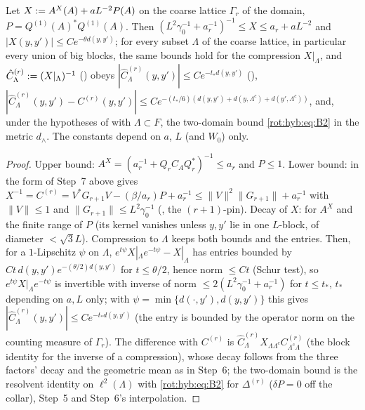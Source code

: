 \begin{proposition}\label{rot:hyb:prop:CLam}
Let $X:= A^X(A)+aL^{-2}P(A)$ on the coarse lattice $\Gamma_r$ of the domain, $P=Q^{(1)}(A)^*Q^{(1)}(A)$. Then $(L^2\gamma_0^{-1}+a_r^{-1})^{-1}\le X\le a_r+aL^{-2}$ and $|X(y,y')|\le Ce^{-\theta d(y,y')}$; for every subset $\Lambda$ of the coarse lattice, in particular every union of big blocks, the same bounds hold for the compression $X|_\Lambda$, and $\hat C^{(r)}_\Lambda:=(X|_\Lambda)^{-1}$ (\cite[(5.53)]{K2}) obeys $|\hat C^{(r)}_\Lambda(y,y')|\le Ce^{-t_*d(y,y')}$ (\cite[(5.54)]{K2}), $|\hat C^{(r)}_\Lambda(y,y')-C^{(r)}(y,y')|\le Ce^{-(t_*/6)(d(y,y')+d(y,\Lambda^c)+d(y',\Lambda^c))}$, and, under the hypotheses of  with $\Lambda\subset F$, the two-domain bound \eqref{rot:hyb:eq:B2} in the metric $d_\wedge$. The constants depend on $a$, $L$ (and $W_0$) only.
\end{proposition}
\begin{proof}
Upper bound: $A^X=(a_r^{-1}+Q_rC_AQ_r^*)^{-1}\le a_r$ and $P\le1$. Lower bound: \cite[(3.6)]{Ba4} in the form of Step~7 above gives $X^{-1}=C^{(r)}=V^*G_{r+1}V-(\beta/a_r)P+a_r^{-1}\le\|V\|^2\|G_{r+1}\|+a_r^{-1}$ with $\|V\|\le1$ and $\|G_{r+1}\|\le L^2\gamma_0^{-1}$ (, the $(r+1)$-pin). Decay of $X$:  for $A^X$ and the finite range of $P$ (its kernel vanishes unless $y,y'$ lie in one $L$-block, of diameter $<\sqrt3L$). Compression to $\Lambda$ keeps both bounds and the entries. Then, for a $1$-Lipschitz $\psi$ on $\Lambda$, $e^{t\psi}X|_\Lambda e^{-t\psi}-X|_\Lambda$ has entries bounded by $Ct\,d(y,y')e^{-(\theta/2)d(y,y')}$ for $t\le\theta/2$, hence norm $\le Ct$ (Schur test), so $e^{t\psi}X|_\Lambda e^{-t\psi}$ is invertible with inverse of norm $\le2(L^2\gamma_0^{-1}+a_r^{-1})$ for $t\le t_*$, $t_*$ depending on $a,L$ only; with $\psi=\min\{d(\cdot,y'),d(y,y')\}$ this gives $|\hat C^{(r)}_\Lambda(y,y')|\le Ce^{-t_*d(y,y')}$ (the entry is bounded by the operator norm on the counting measure of $\Gamma_r$). The difference with $C^{(r)}$ is $\hat C^{(r)}_\Lambda X_{\Lambda\Lambda^c}C^{(r)}_{\Lambda^c\Lambda}$ (the block identity for the inverse of a compression), whose decay follows from the three factors' decay and the geometric mean as in Step~6; the two-domain bound is the resolvent identity on $\ell^2(\Lambda)$ with \eqref{rot:hyb:eq:B2} for $\Delta^{(r)}$ ($\delta P=0$ off the collar), Step~5 and Step~6's interpolation.
\end{proof}
